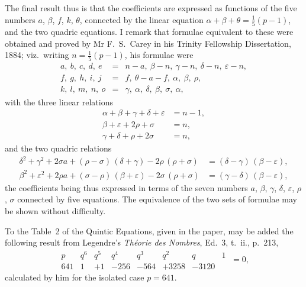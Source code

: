 \documentclass[11pt,a4paper]{article}
\providecommand{\textsc}[1]{{\scshape #1}}
\begin{document}
\fancyhead[L]{\small 815]}
\fancyhead[C]{\small\textsc{the binomial equation $x^{p} - 1 = 0$.}}

\thispagestyle{plain}
\noindent The final result thus is that the coefficients are expressed as functions of the five numbers $a$, $\beta$, $f$, $k$, $\theta$, connected by the linear equation $\alpha + \beta + \theta = \tfrac{1}{5}(p - 1)$, and the two quadric equations.  I remark that formulae equivalent to these were obtained and proved by Mr F.~S.~Carey in his Trinity Fellowship Dissertation, 1884; viz.\ writing $n = \tfrac{1}{5}(p - 1)$, his formulae were
\[
\begin{array}{cccccc}
a,\ b,\ c,\ d,\ e &=& n - a,\ \beta - n,\ \gamma - n,\ \delta - n,\ \varepsilon - n,\\
f,\ g,\ h,\ i,\ j &=& f,\ \theta - a - f,\ \alpha,\ \beta,\ \rho,\\
k,\ l,\ m,\ n,\ o &=& \gamma,\ \alpha,\ \delta,\ \beta,\ \sigma,\ \alpha,
\end{array}
\]
with the three linear relations
\[
\begin{aligned}
\alpha + \beta + \gamma + \delta + \varepsilon &= n - 1,\\
\beta + \varepsilon + 2\rho + \sigma &= n,\\
\gamma + \delta + \rho + 2\sigma &= n,
\end{aligned}
\]
and the two quadric relations
\[
\begin{aligned}
\delta^{2} + \gamma^{2} + 2\sigma a + (\rho - \sigma)\,(\delta + \gamma) - 2\rho\,(\rho + \sigma) &= (\delta - \gamma)\,(\beta - \varepsilon),\\
\beta^{2} + \varepsilon^{2} + 2\rho a + (\sigma - \rho)\,(\beta + \varepsilon) - 2\sigma\,(\rho + \sigma) &= (\gamma - \delta)\,(\beta - \varepsilon),
\end{aligned}
\]
the coefficients being thus expressed in terms of the seven numbers $a$, $\beta$, $\gamma$, $\delta$, $\varepsilon$, $\rho$, $\sigma$ connected by five equations.  The equivalence of the two sets of formulae may be shown without difficulty.

\medskip
To the Table~2 of the Quintic Equations, given in the paper, may be added the following result from Legendre's \textit{Th\'eorie des Nombres}, Ed.~3, t.~ii., p.~213,
\[
\begin{array}{c|ccccccc}
p   & q^{6} & q^{5} & q^{4} & q^{3} & q^{2} & q & 1 \\\hline
641 & 1     & +1    & -256  & -564  & +3258 & -3120 &
\end{array}\ = 0,
\]
calculated by him for the isolated case $p = 641$.
\end{document}
